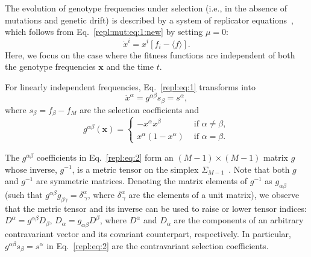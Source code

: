 \documentclass[9pt,twocolumn,twoside]{gsajnl}
\begin{document}
The evolution of genotype frequencies under selection (i.e., in the absence of mutations and genetic drift)
is described by a system of replicator equations~\citep{Eigen1988,Eigen1989,Hofbauer1998,Page2002,Nowak2006book},
which follows from Eq.~\eqref{repl:mut:eq:1:new} by setting $\mu = 0$:
\begin{equation} \label{repl:eq:1}
\dot{x}^i = x^i \left[ f_i - \langle f \rangle \right].
\end{equation}
Here, we focus on the case where the fitness functions are independent of both the genotype frequencies $\mathbf{x}$ and the time $t$.

For linearly independent frequencies, Eq.~\eqref{repl:eq:1} transforms into
\begin{equation} \label{repl:eq:2}
\dot{x}^\alpha = g^{\alpha \beta} s_\beta = s^\alpha,
\end{equation}
where $s_\beta = f_\beta - f_M$ are the selection coefficients and
\begin{equation} \label{metric:inv}
g^{\alpha \beta} (\mathbf{x}) = \left\{
\begin{array}{cc}
-x^\alpha x^\beta & \text{ if } \alpha \ne \beta,  \\
x^\alpha (1 - x^\alpha) & \text{ if } \alpha = \beta.
\end{array}
\right.
\end{equation}

The $g^{\alpha \beta}$ coefficients in Eq.~\eqref{repl:eq:2} form an $(M-1) \times (M-1)$ matrix $g$ whose inverse, $g^{-1}$, is a metric tensor on the simplex $\Sigma_{M-1}$~\citep{Hofbauer1998}.
Note that both $g$ and $g^{-1}$ are symmetric matrices.
Denoting the matrix elements of $g^{-1}$ as $g_{\alpha \beta}$ (such that $g^{\alpha \beta} g_{\beta \gamma} = \delta^{\alpha}_{~\gamma}$, where $\delta^{\alpha}_{~\gamma}$ are the elements of a unit matrix), we observe that the metric tensor and its inverse can be used to raise or lower tensor indices: $D^{\alpha} = g^{\alpha \beta} D_\beta$, $D_{\alpha} = g_{\alpha \beta} D^\beta$, where $D^{\alpha}$ and $D_{\alpha}$
are the components of an arbitrary contravariant vector and its covariant counterpart, respectively. In particular, $g^{\alpha \beta} s_\beta = s^\alpha$ in Eq.~\eqref{repl:eq:2} are the contravariant selection coefficients.
\end{document}
